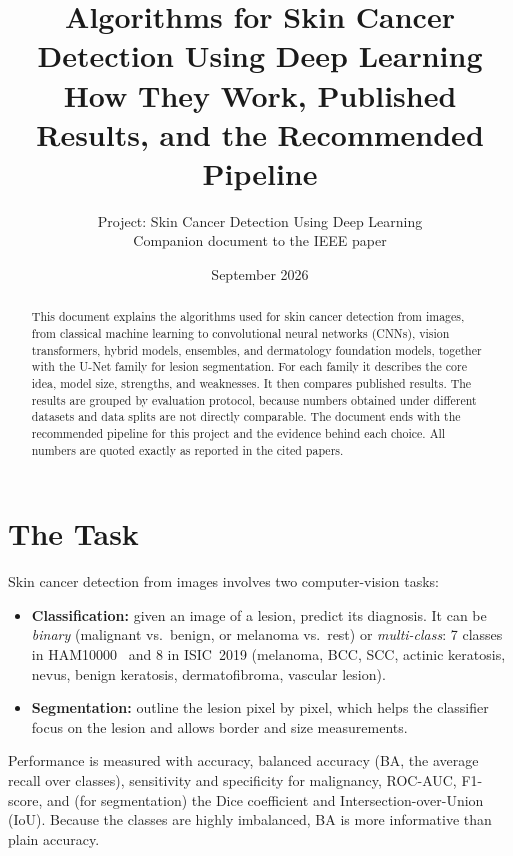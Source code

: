 \documentclass[10pt,a4paper]{article}
\title{\color{hcBlue}\bfseries Algorithms for Skin Cancer Detection Using Deep Learning\\[4pt]
\large How They Work, Published Results, and the Recommended Pipeline}
\author{Project: Skin Cancer Detection Using Deep Learning\\
\small Companion document to the IEEE paper}
\date{September 2026}
\begin{document}
\maketitle
\thispagestyle{empty}

\begin{abstract}
\noindent This document explains the algorithms used for skin cancer
detection from images, from classical machine learning to
convolutional neural networks (CNNs), vision transformers, hybrid
models, ensembles, and dermatology foundation models, together with the
U-Net family for lesion segmentation. For each family it describes the
core idea, model size, strengths, and weaknesses. It then compares
published results. The results are grouped by evaluation protocol,
because numbers obtained under different datasets and data splits are
not directly comparable. The document ends with the recommended
pipeline for this project and the evidence behind each choice. All
numbers are quoted exactly as reported in the cited papers.
\end{abstract}

\tableofcontents
\newpage

\section{The Task}
Skin cancer detection from images involves two computer-vision tasks:
\begin{itemize}
  \item \textbf{Classification:} given an image of a lesion, predict its
        diagnosis. It can be \emph{binary} (malignant vs.\ benign, or
        melanoma vs.\ rest) or \emph{multi-class}: 7 classes in
        HAM10000~\cite{tschandl2018ham10000} and 8 in ISIC~2019
        (melanoma, BCC, SCC, actinic keratosis, nevus, benign keratosis,
        dermatofibroma, vascular lesion).
  \item \textbf{Segmentation:} outline the lesion pixel by pixel, which
        helps the classifier focus on the lesion and allows border and
        size measurements.
\end{itemize}
Performance is measured with accuracy, balanced accuracy (BA, the
average recall over classes), sensitivity and specificity for
malignancy, ROC-AUC, F1-score, and (for segmentation) the Dice
coefficient and Intersection-over-Union (IoU). Because the classes are
highly imbalanced, BA is more informative than plain accuracy.
\end{document}
